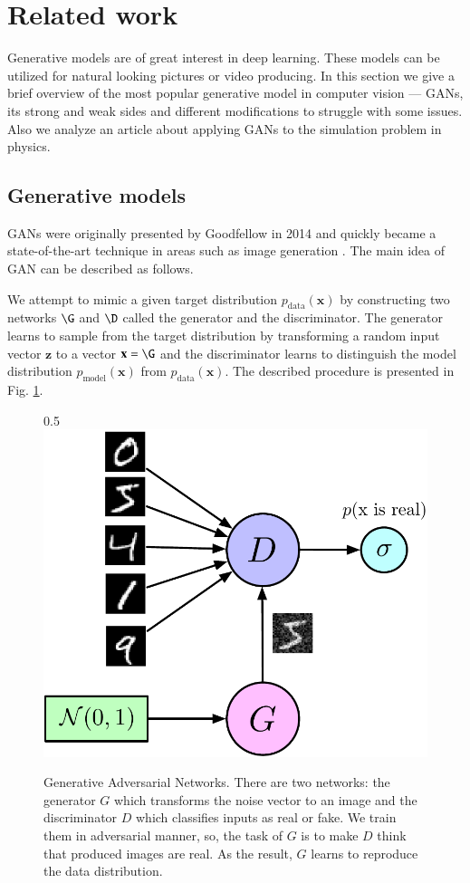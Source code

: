 \documentclass{webofc}
\begin{document}
\section{Related work}
Generative models are of great interest in deep learning. These models can be utilized for natural looking pictures or video producing. In this section we give a brief overview of the most popular generative model in computer vision --- GANs, its strong and weak sides and different modifications to struggle with some issues. Also we analyze an article about applying GANs to the simulation problem in physics.

\subsection{Generative models}
GANs were originally presented by Goodfellow in 2014 \cite{goodfellow2014generative} and quickly became a state-of-the-art technique in areas such as image generation \cite{radford2015unsupervised}. The main idea of GAN can be described as follows.

We attempt to mimic a given target distribution $p_{\text{data}} (\textbf{x})$ by constructing two networks $\G$ and $\D$ called the generator and the discriminator. The generator learns to sample from the target distribution by transforming a random input vector $\textbf{z}$ to a vector $\textbf{x} = \G$ and the discriminator learns to distinguish the model distribution $p_\text{model} (\textbf{x})$ from $p_{\text{data}} (\textbf{x})$. The described procedure is presented in Fig. \ref{fig:GANs}.

\begin{figure}[h!]
\centering
\begin{tabular}{0.5\textwidth}
  \centering
  \includegraphics[width=0.3\linewidth]{figures/gan_pic.pdf}
\end{tabular}
\caption{Generative Adversarial Networks. There are two networks: the generator $G$ which transforms the noise vector to an image and the discriminator $D$ which classifies inputs as real or fake. We train them in adversarial manner, so, the task of $G$ is to make $D$ think that produced images are real. As the result, $G$ learns to reproduce the data distribution.}
\label{fig:GANs}
\end{figure}
\end{document}
